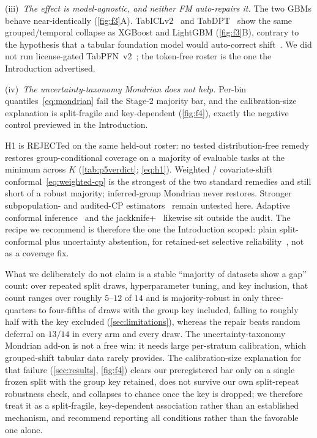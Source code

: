 \documentclass[pdflatex,sn-mathphys-num]{sn-jnl}
\begin{document}
(iii)~\emph{The effect is model-agnostic, and neither FM auto-repairs it.} The two GBMs behave
near-identically (\cref{fig:f3}A). TabICLv2~\citep{qu2026tabicl} and TabDPT~\citep{ma2024tabdpt} show the
same grouped/temporal collapse as XGBoost and LightGBM (\cref{fig:f3}B), contrary to the hypothesis that
a tabular foundation model would auto-correct shift~\citep{helli2024driftresilient,tabpfn_openenv2025,tfm_uncertainty_esann2026,beyondiid2026}.
We did not run license-gated TabPFN~v2~\citep{hollmann2025tabpfn}; the token-free roster is the one the
Introduction advertised.

(iv)~\emph{The uncertainty-taxonomy Mondrian does not help.} Per-bin quantiles~\eqref{eq:mondrian} fail
the Stage-2 majority bar, and the calibration-size explanation is split-fragile and key-dependent
(\cref{fig:f4}), exactly the negative control previewed in the Introduction.

H1 is REJECTed on the same held-out roster: no tested distribution-free remedy restores
group-conditional coverage on a majority of evaluable tasks at the minimum across $K$
(\cref{tab:p5verdict}; \eqref{eq:h1}). Weighted / covariate-shift conformal~\eqref{eq:weighted-cp} is the
strongest of the two standard remedies and still short of a robust majority; inferred-group Mondrian
never restores. Stronger subpopulation- and audited-CP estimators~\citep{subpop2025conformal,audited2026conformal}
remain untested here. Adaptive conformal inference~\citep{gibbs2021adaptive} and the jackknife+~\citep{barber2021jackknife}
likewise sit outside the audit. The recipe we recommend is therefore the one the Introduction scoped:
plain split-conformal plus uncertainty abstention, for retained-set selective
reliability~\citep{elyaniv2010selective,geifman2017selective,campagner2021threeway,he2025conjunction},
not as a coverage fix.

What we deliberately do not claim is a stable ``majority of datasets show a gap'' count: over repeated
split draws, hyperparameter tuning, and key inclusion, that count ranges over roughly $5$--$12$ of $14$
and is majority-robust in only three-quarters to four-fifths of draws with the group key included,
falling to roughly half with the key excluded (\cref{sec:limitations}), whereas the repair beats random
deferral on $13/14$ in every arm and every draw. The uncertainty-taxonomy Mondrian add-on is not a free
win: it needs large per-stratum calibration, which grouped-shift tabular data rarely provides.
The calibration-size explanation for that failure (\cref{sec:results}, \cref{fig:f4}) clears our
preregistered bar only on a single frozen split with the group key retained, does not survive our own
split-repeat robustness check, and collapses to chance once the key is dropped; we therefore treat it as a
split-fragile, key-dependent association rather than an established mechanism, and recommend reporting all
conditions rather than the favorable one alone.
\end{document}
